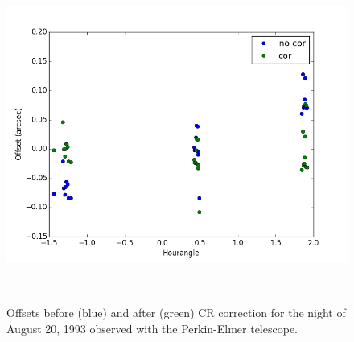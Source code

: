\documentclass[12pt,a4paper]{report}
\begin{document}
\begin{figure}
\centering
\includegraphics[height=11.0cm]{Netuno_160_1993-08-20.png} 
\caption{Offsets before (blue) and after (green) CR correction for the night of August 20, 1993 observed with the Perkin-Elmer telescope.}
\label{Fig:refraction-sample-neptune}
\end{figure}
\end{document}
